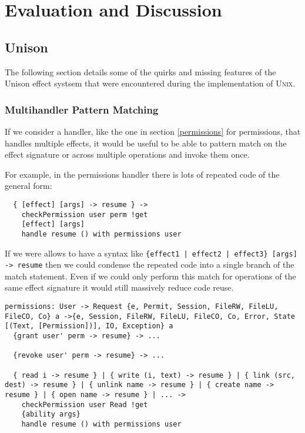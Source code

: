 \documentclass[logo,bsc,singlespacing,parskip]{infthesis}
\begin{document}
\chapter{Evaluation and Discussion}

\section{Unison}

The following section details some of the quirks and missing features of the Unison
effect systsem that were encountered during the implementation of \textsc{Unix}.

\subsection{Multihandler Pattern Matching}
\label{multihandler}

If we consider a handler, like the one in section \ref{permissions} for
permissions, that handles multiple effects, it would be useful to be able to
pattern match on the effect signature or across multiple operations and invoke
them once.

For example, in the permissions handler there is lots of repeated code of the general form:

\begin{lstlisting}
  { [effect] [args] -> resume } -> 
    checkPermission user perm !get
    [effect] [args]
    handle resume () with permissions user
\end{lstlisting}

If we were allows to have a syntax like \texttt{\{effect1 | effect2 | effect3\}
[args] -> resume} then we could condense the repeated code into a single branch
of the match statement. Even if we could only perform this match for operations
of the same effect signature it would still massively reduce code reuse.

\begin{lstlisting}[language=unison]
permissions: User -> Request {e, Permit, Session, FileRW, FileLU, FileCO, Co} a ->{e, Session, FileRW, FileLU, FileCO, Co, Error, State [(Text, [Permission])], IO, Exception} a
  {grant user' perm -> resume} -> ...

  {revoke user' perm -> resume} -> ...

  { read i -> resume } | { write (i, text) -> resume } | { link (src, dest) -> resume } | { unlink name -> resume } | { create name -> resume } | { open name -> resume } | ... -> 
    checkPermission user Read !get
    {ability args}
    handle resume () with permissions user
\end{lstlisting}
\end{document}
